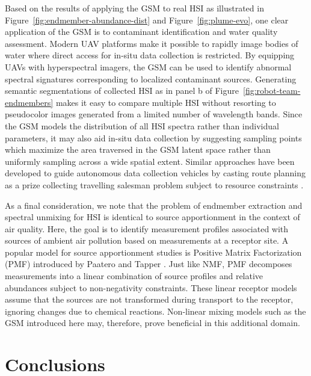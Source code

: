 \documentclass[remotesensing,article,submit,pdftex,moreauthors]{Definitions/mdpi}
\begin{document}
Based on the results of applying the GSM to real HSI as illustrated in Figure~\ref{fig:endmember-abundance-dist} and Figure~\ref{fig:plume-evo}, one clear application of the GSM is to contaminant identification and water quality assessment. Modern UAV platforms make it possible to rapidly image bodies of water where direct access for in-situ data collection is restricted. By equipping UAVs with hyperspectral imagers, the GSM can be used to identify abnormal spectral signatures corresponding to localized contaminant sources. Generating semantic segmentations of collected HSI as in panel b of Figure~\ref{fig:robot-team-endmembers} makes it easy to compare multiple HSI without resorting to pseudocolor images generated from a limited number of wavelength bands. Since the GSM models the distribution of all HSI spectra rather than individual parameters, it may also aid in-situ data collection by suggesting sampling points which maximize the area traversed in the GSM latent space rather than uniformly sampling across a wide spatial extent. Similar approaches have been developed to guide autonomous data collection vehicles by casting route planning as a prize collecting travelling salesman problem subject to resource constraints \cite{balas2007prize, suryan2020learning}.

As a final consideration, we note that the problem of endmember extraction and spectral unmixing for HSI is identical to source apportionment in the context of air quality. Here, the goal is to identify measurement profiles associated with sources of ambient air pollution based on measurements at a receptor site. A popular model for source apportionment studies is Positive Matrix Factorization (PMF) introduced by Paatero and Tapper \cite{pmf-orig, ulbrich2009interpretation}. Just like NMF, PMF decomposes measurements into a linear combination of source profiles and relative abundances subject to non-negativity constraints. These linear receptor models assume that the sources are not transformed during transport to the receptor, ignoring changes due to chemical reactions. Non-linear mixing models such as the GSM introduced here may, therefore, prove beneficial in this additional domain.


\section{Conclusions}\label{sec:conclusions}
\end{document}

